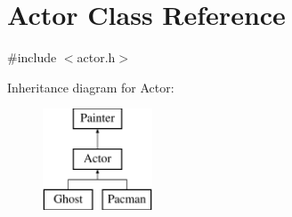 \hypertarget{class_actor}{}\section{Actor Class Reference}
\label{class_actor}


{\ttfamily \#include $<$actor.\+h$>$}

Inheritance diagram for Actor\+:\begin{figure}[H]
\begin{center}
\leavevmode
\includegraphics[height=3.000000cm]{class_actor}
\end{center}
\end{figure}
